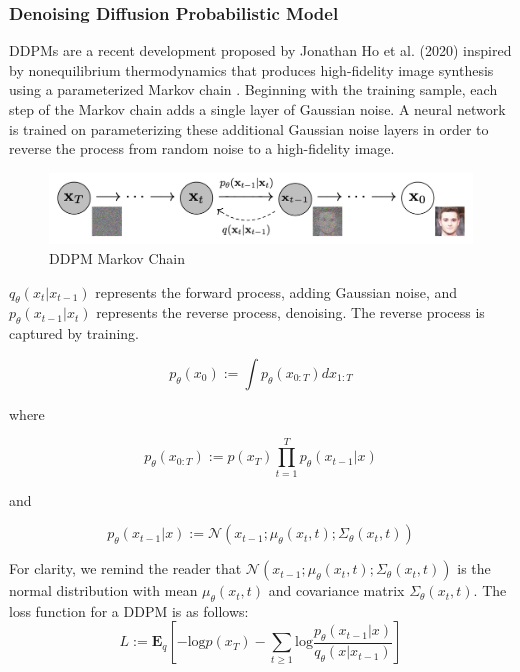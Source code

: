 \documentclass[%
 reprint,
 amsmath,amssymb,
 aps,
]{revtex4-2}
\begin{document}
\subsubsection{Denoising Diffusion Probabilistic Model}

DDPMs are a recent development proposed by Jonathan Ho et al. (2020) inspired by nonequilibrium thermodynamics that produces high-fidelity image synthesis using a parameterized Markov chain \cite{ho2020denoising}. Beginning with the training sample, each step of the Markov chain adds a single layer of Gaussian noise. A neural network is trained on parameterizing these additional Gaussian noise layers in order to reverse the process from random noise to a high-fidelity image.

\begin{figure}[h]
    \includegraphics[width=0.9\columnwidth]{ddpm.png}
    \caption{\label{fig:vae}DDPM Markov Chain \cite{ho2020denoising}}
\end{figure}


$q_\theta(x_t|x_{t-1} )$  represents the forward process, adding Gaussian noise, and $p_\theta(x_{t-1}|x_t )$ represents the reverse process, denoising. The reverse process is captured by training.

\begin{equation}
p_\theta(x_0) :=\int p_\theta(x_{0:T} ) dx_{1:T}
\end{equation}

where

\begin{equation}
p_\theta(x_{0:T}) := p(x_T)\prod_{t=1}^{T} p_\theta(x_{t-1}|x)
\end{equation}

and

\begin{equation}
p_\theta(x_{t-1}|x) := \mathcal{N}(x_{t-1};\mu_\theta(x_t,t); \Sigma_\theta(x_t,t))
\end{equation}

For clarity, we remind the reader that $\mathcal{N}(x_{t-1};\mu_\theta(x_t,t); \Sigma_\theta(x_t,t))$ is the normal distribution with mean $\mu_\theta(x_t,t)$ and covariance matrix $\Sigma_\theta(x_t,t)$. The loss function for a DDPM is as follows:
\begin{equation}
L := \mathbf{E}_q[-\mathrm{log} p(x_T) - \sum_{t\ge1}\mathrm{log} \frac{p_\theta(x_{t-1}|x )}{q_\theta(x|x_{t-1} )}]
\end{equation}
\end{document}
